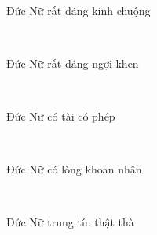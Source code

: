 \documentclass[12pt]{article}
\begin{document}
\begin{paracol}{2}
\begin{leftcolumn*}
\Large{\ \ \  }\\
\end{leftcolumn*}

\begin{rightcolumn}
Đức Nữ rất đáng kính chuộng\\
\end{rightcolumn}

\begin{leftcolumn*}
\Large{\ \ \  }\\
\end{leftcolumn*}

\begin{rightcolumn}
Đức Nữ rất đáng ngợi khen\\
\end{rightcolumn}

\begin{leftcolumn*}
\Large{\ \ \  }\\
\end{leftcolumn*}

\begin{rightcolumn}
Đức Nữ có tài có phép\\
\end{rightcolumn}

\begin{leftcolumn*}
\Large{\ \ \   }\\
\end{leftcolumn*}

\begin{rightcolumn}
Đức Nữ có lòng khoan nhân\\
\end{rightcolumn}

\begin{leftcolumn*}
\Large{\ \ \  }\\
\end{leftcolumn*}

\begin{rightcolumn}
Đức Nữ trung tín thật thà\\
\end{rightcolumn}

\begin{leftcolumn*}
\Large{\ \ \ }\\
\end{leftcolumn*}


\end{paracol}
\end{document}
